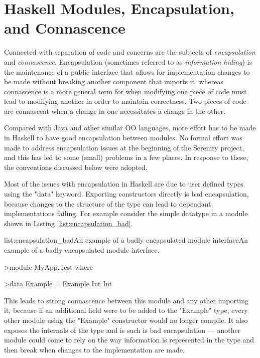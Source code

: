 \section{Haskell Modules, Encapsulation, and Connascence}
\label{sec:encapsulation}

Connected with separation of code and concerns are the subjects of \emph{encapsulation} and \emph{connascence}. Encapsulation (sometimes referred to as \emph{information hiding}) is the maintenance of a public interface that allows for implementation changes to be made without breaking another component that imports it, whereas connascence is a more general term for when modifying one piece of code must lead to modifying another in order to maintain correctness. Two pieces of code are connascent when a change in one necessitates a change in the other.

Compared with Java and other similar OO languages, more effort has to be made in Haskell to have good encapsulation between modules. No formal effort was made to address encapsulation issues at the beginning of the Serenity project, and this has led to some (small) problems in a few places. In response to these, the conventions discussed below were adopted.

Most of the issues with encapsulation in Haskell are due to user defined types using the "data" keyword. Exporting constructors directly is bad encapsulation, because changes to the structure of the type can lead to dependant implementations failing. For example consider the simple datatype in a module shown in Listing \ref{list:encapsulation_bad}.

\vspace{-0.5em}
\begin{listing}{list:encapsulation_bad}{An example of a badly encapsulated module interface}{An example of a badly encapsulated module interface.}{}
\end{listing}\vspace{-1.5em}

\begin{haskell}
>module MyApp.Test where

>data Example = Example Int Int

\end{haskell}
\noindent
This leads to strong connascence between this module and any other importing it, because if an additional field were to be added to the "Example" type, every other module using the "Example" constructor would no longer compile. It also exposes the internals of the type and is such is bad encapsulation --- another module could come to rely on the way information is represented in the type and then break when changes to the implementation are made.

